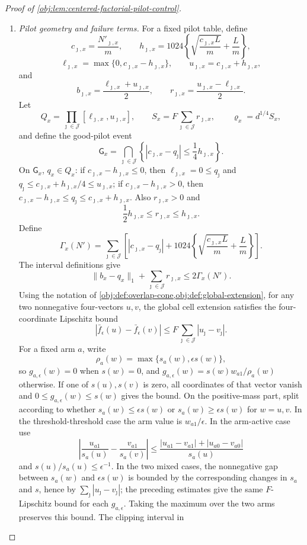 \begin{proof}[Proof of \cref{obj:lem:centered-factorial-pilot-control}]
\begin{enumerate}
\item \label{item:pf-pilot-geometry-failure}\emph{Pilot geometry and failure terms.}
For a fixed pilot table, define
\[
c_{\jmath,x}=\frac{N'_{\jmath,x}}m,\qquad
h_{\jmath,x}=1024\left\{\sqrt{\frac{c_{\jmath,x}L}{m}}+\frac Lm\right\},
\]
\[
\ell_{\jmath,x}=\max\{0,c_{\jmath,x}-h_{\jmath,x}\},\qquad
u_{\jmath,x}=c_{\jmath,x}+h_{\jmath,x},
\]
and
\[
b_{\jmath,x}=\frac{\ell_{\jmath,x}+u_{\jmath,x}}2,\qquad
r_{\jmath,x}=\frac{u_{\jmath,x}-\ell_{\jmath,x}}2 .
\]
Let
\[
Q_x=\prod_{\jmath\in\mathcal J}[\ell_{\jmath,x},u_{\jmath,x}],
\qquad
S_x=F\sum_{\jmath\in\mathcal J}r_{\jmath,x},
\qquad
\varrho_x=d^{1/4}S_x,
\]
and define the good-pilot event
\[
\mathsf G_x
=
\bigcap_{\jmath\in\mathcal J}
\left\{
|c_{\jmath,x}-q_\jmath|\le \frac14h_{\jmath,x}
\right\}.
\]
On \(\mathsf G_x\), \(q_x\in Q_x\): if \(c_{\jmath,x}-h_{\jmath,x}\le0\), then
\(\ell_{\jmath,x}=0\le q_\jmath\) and
\(q_\jmath\le c_{\jmath,x}+h_{\jmath,x}/4\le u_{\jmath,x}\); if
\(c_{\jmath,x}-h_{\jmath,x}>0\), then
\(c_{\jmath,x}-h_{\jmath,x}\le q_\jmath\le c_{\jmath,x}+h_{\jmath,x}\).
Also \(r_{\jmath,x}>0\) and
\[
\frac12h_{\jmath,x}\le r_{\jmath,x}\le h_{\jmath,x}.
\]
Define
\[
\Gamma_x(N')
=
\sum_{\jmath\in\mathcal J}
\left[
|c_{\jmath,x}-q_\jmath|
+
1024\left\{\sqrt{\frac{c_{\jmath,x}L}{m}}+\frac Lm\right\}
\right].
\]
The interval definitions give
\[
\|b_x-q_x\|_1+\sum_{\jmath\in\mathcal J}r_{\jmath,x}
\le 2\Gamma_x(N').
\]
Using the notation of \cref{obj:def:overlap-cone,obj:def:global-extension}, for any two nonnegative four-vectors \(u,v\), the global cell extension satisfies the four-coordinate Lipschitz bound
\[
|\bar f_\epsilon(u)-\bar f_\epsilon(v)|
\le
F\sum_{\jmath\in\mathcal J}|u_\jmath-v_\jmath|.
\]
For a fixed arm \(a\), write
\[
\rho_a(w)=\max\{s_a(w),\epsilon s(w)\},
\]
so \(g_{a,\epsilon}(w)=0\) when \(s(w)=0\), and
\(g_{a,\epsilon}(w)=s(w)w_{a1}/\rho_a(w)\) otherwise.  If one of
\(s(u),s(v)\) is zero, all coordinates of that vector vanish and
\(0\le g_{a,\epsilon}(w)\le s(w)\) gives the bound.  On the positive-mass part, split according to whether
\(s_a(w)\le\epsilon s(w)\) or \(s_a(w)\ge\epsilon s(w)\) for \(w=u,v\).  In the threshold-threshold case the arm value is
\(w_{a1}/\epsilon\).  In the arm-active case use
\[
\left|\frac{u_{a1}}{s_a(u)}-\frac{v_{a1}}{s_a(v)}\right|
\le
\frac{|u_{a1}-v_{a1}|+|u_{a0}-v_{a0}|}{s_a(u)}
\]
and \(s(u)/s_a(u)\le\epsilon^{-1}\).  In the two mixed cases, the nonnegative gap between \(s_a(w)\) and \(\epsilon s(w)\) is bounded by the corresponding changes in \(s_a\) and \(s\), hence by
\(\sum_{\jmath}|u_\jmath-v_\jmath|\); the preceding estimates give the same \(F\)-Lipschitz bound for each \(g_{a,\epsilon}\).  Taking the maximum over the two arms preserves this bound.  The clipping interval in

\end{enumerate}
\end{proof}
